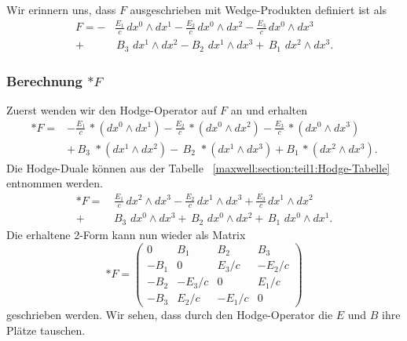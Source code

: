 Wir erinnern uns, dass $F$ ausgeschrieben mit Wedge-Produkten definiert ist als
\begin{align*}
	F = 
	- &\frac{E_{1}}{c} \, dx^0 \wedge dx^1 - \frac{E_{2}}{c} \, dx^0 \wedge dx^2 - \frac{E_{3}}{c} \, dx^0 \wedge dx^3 \\
	+ & \, B_3 \, \, dx^1 \wedge dx^2 - B_2 \, \, dx^1 \wedge dx^3 + \, B_1 \, \, dx^2 \wedge dx^3.
\end{align*}



\subsubsection{Berechnung $\ast F$}
Zuerst wenden wir den Hodge-Operator auf $F$ an und erhalten
\begin{align*}
	\ast F =
	& - \frac{E_{1}}{c} \, {\ast}(dx^0 \wedge dx^1) - \frac{E_{2}}{c} \, {\ast}(dx^0 \wedge dx^2) - \frac{E_{3}}{c} \, {\ast}(dx^0 \wedge dx^3) \\
	& + \, B_3 \, \, {\ast}(dx^1 \wedge dx^2) - \, B_2 \, \, {\ast}(dx^1 \wedge dx^3) + B_1 \, {\ast}(dx^2 \wedge dx^3).
\end{align*}
Die Hodge-Duale können aus der Tabelle ~\ref{maxwell:section:teil1:Hodge-Tabelle} entnommen werden.
\begin{align*}
	\ast F =
	& \, \frac{E_{1}}{c} \, dx^2 \wedge dx^3 - \frac{E_{2}}{c} \, dx^1 \wedge dx^3 + \frac{E_{3}}{c} \, dx^1 \wedge dx^2 \\
	 + & \, B_3 \, \, dx^0 \wedge dx^3 + \, B_2 \, \, dx^0 \wedge dx^2 + \, B_1 \, \, dx^0 \wedge dx^1.
\end{align*}
Die erhaltene 2-Form kann nun wieder als Matrix
\begin{equation}
	\ast F = \begin{pmatrix}
		0 & B_1 & B_2 & B_3 \\ -B_1 & 0 & E_3/c & -E_2/c \\ -B_2 & -E_3/c & 0 & E_1/c \\ -B_3 & E_2/c & -E_1/c & 0 
	\end{pmatrix}
\end{equation}
geschrieben werden.
Wir sehen, dass durch den Hodge-Operator die $E$ und $B$ ihre Plätze tauschen.
